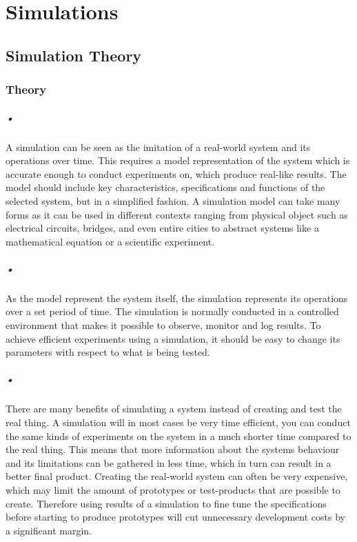 \documentclass[a4paper, 12pt, openright, twoside]{report}
\begin{document}
\chapter{Simulations}
\label{cha:3}

\section{Simulation Theory}

\subsection{Theory}
\paragraph{•}
A simulation can be seen as the imitation of a real-world system and its operations over time.
This requires a model representation of the system which is accurate enough to conduct experiments on, which produce real-like results.
The model should include key characteristics, specifications and functions of the selected system, but in a simplified fashion.
A simulation model can take many forms as it can be used in different contexts ranging from physical object such as electrical circuits, bridges, and even entire cities to abstract systems like a mathematical equation or a scientific experiment\cite{simulations}.

\paragraph{•}
As the model represent the system itself, the simulation represents its operations over a set period of time.
The simulation is normally conducted in a controlled environment that makes it possible to observe, monitor and log results.
To achieve efficient experiments using a simulation, it should be easy to change its parameters with respect to what is being tested.

\paragraph{•}
There are many benefits of simulating a system instead of creating and test the real thing.
A simulation will in most cases be very time efficient, you can conduct the same kinds of experiments on the system in a much shorter time compared to the real thing.
This means that more information about the systems behaviour and its limitations can be gathered in less time, which in turn can result in a better final product.
Creating the real-world system can often be very expensive, which may limit the amount of prototypes or test-products that are possible to create.
Therefore using results of a simulation to fine tune the specifications before starting to produce prototypes will cut unnecessary development costs by a significant margin.
\end{document}

